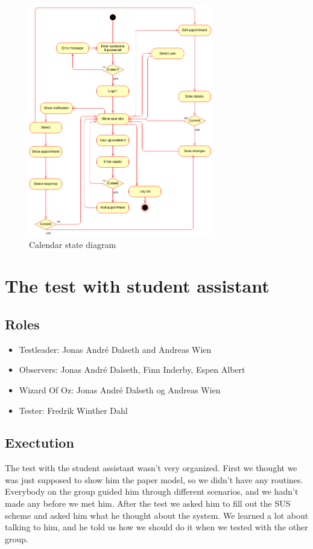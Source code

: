 \documentclass{article}
\begin{document}
\begin{figure}[h!] 
    \begin{center} 
        \includegraphics[width=8cm]{calendarStateDiagram.png}
        \caption{Calendar state diagram}
    \label{calendarstatediagram}
    \end{center}
\end{figure}



\section{The test with student assistant}
\subsection{Roles}
\begin{itemize}
\item Testleader: Jonas André Dalseth and Andreas Wien
\item Observers: Jonas André Dalseth, Finn Inderby, Espen Albert
\item Wizard Of Oz: Jonas André Dalseth og Andreas Wien
\item Tester: Fredrik Winther Dahl
\end{itemize}

\subsection{Exectution}
The test with the student assistant wasn't very organized. First we thought we was just supposed to show him the paper model, so we didn't have any routines. Everybody on the group guided him through different scenarios, and we hadn't made any before we met him. After the test we asked him to fill out the SUS scheme and asked him what he thought about the system. We learned a lot about talking to him, and he told us how we should do it when we tested with the other group. 
\end{document}
